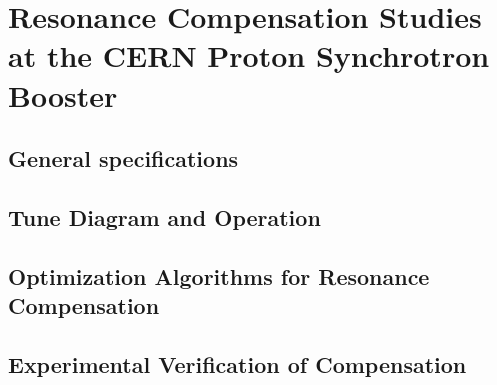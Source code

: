 \chapter{Resonance Compensation Studies at the CERN Proton Synchrotron Booster}
\label{sec:ch5}

\section{General specifications}

\section{Tune Diagram and Operation}

\section{Optimization Algorithms for Resonance Compensation}

\section{Experimental Verification of Compensation}
